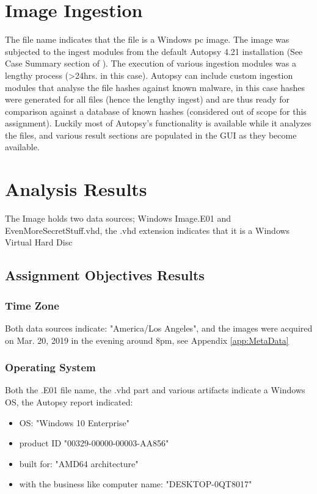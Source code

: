 \documentclass[
	letterpaper, %
	10pt, %
	unnumberedsections, %
	twoside, %
]{APAAssignment}
\begin{document}
\section{Image Ingestion}
The file name indicates that the file is a Windows pc image. The image was subjected to the ingest modules from the default Autopsy 4.21 installation (See Case Summary section of \cite{AutoReport}). The execution of various ingestion modules was a lengthy process (>24hrs. in this case). Autopsy can include custom ingestion modules that analyse the file hashes against known malware, in this case hashes were generated for all files (hence the lengthy ingest) and are thus ready for comparison against a database of known hashes (considered out of scope for this assignment). Luckily most of Autopsy's functionality is available while it analyzes the files, and various result sections are populated in the GUI as they become available.

\section{Analysis Results}
The Image holds two data sources; Windows Image.E01 and EvenMoreSecretStuff.vhd, the .vhd extension indicates that it is a Windows Virtual Hard Disc \cite{WindowsVHD}
\subsection{Assignment Objectives Results}

\subsubsection{Time Zone}
Both data sources indicate: "America/Los Angeles", and the images were acquired on Mar. 20, 2019 in the evening around 8pm, see Appendix \ref{app:MetaData}

\subsubsection{Operating System}
Both the .E01 file name, the .vhd part and various artifacts indicate a Windows OS, the Autopsy report \cite{AutoReport} indicated:

\begin{itemize}
	\item OS: "Windows 10 Enterprise"
	\item product ID "00329-00000-00003-AA856"
	\item built for: "AMD64 architecture"
	\item with the business like computer name: "DESKTOP-0QT8017"
\end{itemize}
\end{document}
